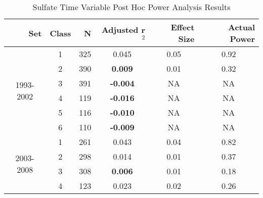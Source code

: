 \begin{table}[htbp]
  \centering
  \caption{Sulfate Time Variable Post Hoc Power Analysis Results}
    \begin{tabular}{rrrrrr}
    \toprule
    Set   & Class & N     & Adjusted r$^2$ & Effect Size & Actual Power \\
    \midrule
    \multicolumn{1}{c}{\multirow{6}[1]{*}{\begin{sideways}1993-2002\end{sideways}}} & \multicolumn{1}{c}{1} & \multicolumn{1}{c}{325} & \multicolumn{1}{c}{0.045 } & \multicolumn{1}{c}{0.05 } & \multicolumn{1}{c}{0.92 } \\
    \multicolumn{1}{c}{} & \multicolumn{1}{c}{2} & \multicolumn{1}{c}{390} & \multicolumn{1}{c}{\textbf{0.009 }} & \multicolumn{1}{c}{0.01 } & \multicolumn{1}{c}{0.32 } \\
    \multicolumn{1}{c}{} & \multicolumn{1}{c}{3} & \multicolumn{1}{c}{391} & \multicolumn{1}{c}{\textbf{-0.004 }} & \multicolumn{1}{c}{ NA} & \multicolumn{1}{c}{NA} \\
    \multicolumn{1}{c}{} & \multicolumn{1}{c}{4} & \multicolumn{1}{c}{119} & \multicolumn{1}{c}{\textbf{-0.016 }} & \multicolumn{1}{c}{NA} & \multicolumn{1}{c}{NA} \\
    \multicolumn{1}{c}{} & \multicolumn{1}{c}{5} & \multicolumn{1}{c}{116} & \multicolumn{1}{c}{\textbf{-0.010 }} & \multicolumn{1}{c}{NA} & \multicolumn{1}{c}{NA} \\
    \multicolumn{1}{c}{} & \multicolumn{1}{c}{6} & \multicolumn{1}{c}{110} & \multicolumn{1}{c}{\textbf{-0.009 }} & \multicolumn{1}{c}{NA} & \multicolumn{1}{c}{NA} \\\midrule
    \multicolumn{1}{c}{\multirow{6}[2]{*}{\begin{sideways}2003-2008\end{sideways}}} & \multicolumn{1}{c}{1} & \multicolumn{1}{c}{261} & \multicolumn{1}{c}{0.043 } & \multicolumn{1}{c}{0.04 } & \multicolumn{1}{c}{0.82 } \\
    \multicolumn{1}{c}{} & \multicolumn{1}{c}{2} & \multicolumn{1}{c}{298} & \multicolumn{1}{c}{0.014 } & \multicolumn{1}{c}{0.01 } & \multicolumn{1}{c}{0.37 } \\
    \multicolumn{1}{c}{} & \multicolumn{1}{c}{3} & \multicolumn{1}{c}{308} & \multicolumn{1}{c}{\textbf{0.006 }} & \multicolumn{1}{c}{0.01 } & \multicolumn{1}{c}{0.18 } \\
    \multicolumn{1}{c}{} & \multicolumn{1}{c}{4} & \multicolumn{1}{c}{123} & \multicolumn{1}{c}{0.023 } & \multicolumn{1}{c}{0.02 } & \multicolumn{1}{c}{0.26 } \\

\end{tabular}
\end{table}
